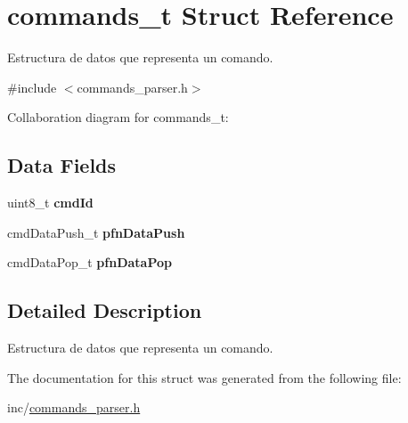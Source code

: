 \hypertarget{structcommands__t}{}\section{commands\+\_\+t Struct Reference}
\label{structcommands__t}


Estructura de datos que representa un comando.  




{\ttfamily \#include $<$commands\+\_\+parser.\+h$>$}



Collaboration diagram for commands\+\_\+t\+:
\subsection*{Data Fields}
\begin{DoxyCompactItemize}
\item 
uint8\+\_\+t {\bfseries cmd\+Id}\hypertarget{structcommands__t_adfb20ce9f05072790b31c3526ca22007}{}\label{structcommands__t_adfb20ce9f05072790b31c3526ca22007}

\item 
cmd\+Data\+Push\+\_\+t {\bfseries pfn\+Data\+Push}\hypertarget{structcommands__t_a30aeaf0b68c054153ace80f874b1bd85}{}\label{structcommands__t_a30aeaf0b68c054153ace80f874b1bd85}

\item 
cmd\+Data\+Pop\+\_\+t {\bfseries pfn\+Data\+Pop}\hypertarget{structcommands__t_a564b9d2b6477bc08459b771c73055da8}{}\label{structcommands__t_a564b9d2b6477bc08459b771c73055da8}

\end{DoxyCompactItemize}


\subsection{Detailed Description}
Estructura de datos que representa un comando. 

The documentation for this struct was generated from the following file\+:\begin{DoxyCompactItemize}
\item 
inc/\hyperlink{commands__parser_8h}{commands\+\_\+parser.\+h}\end{DoxyCompactItemize}

